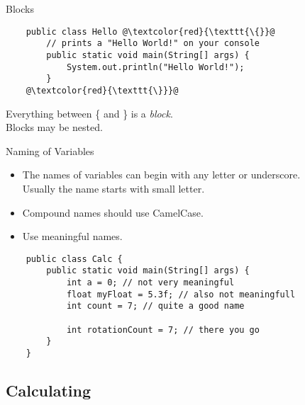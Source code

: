 \begin{frame}[fragile]{Blocks}
    \begin{lstlisting}
    public class Hello @\textcolor{red}{\texttt{\{}}@
        // prints a "Hello World!" on your console
        public static void main(String[] args) {
            System.out.println("Hello World!");
        }
    @\textcolor{red}{\texttt{\}}}@
    \end{lstlisting}
    Everything between \{ and \} is a \emph{block}. \\
    Blocks may be nested.
\end{frame}

\begin{frame}[fragile]{Naming of Variables}
    \begin{itemize}
        \item The names of variables can begin with any letter or underscore. \\
        Usually the name starts with small letter.
        \item Compound names should use CamelCase.
        \item Use meaningful names.
    \end{itemize}
    \begin{lstlisting}
    public class Calc {
        public static void main(String[] args) {
            int a = 0; // not very meaningful
            float myFloat = 5.3f; // also not meaningfull
            int count = 7; // quite a good name

            int rotationCount = 7; // there you go
        }
    }
    \end{lstlisting}
\end{frame}

\subsection{Calculating}

